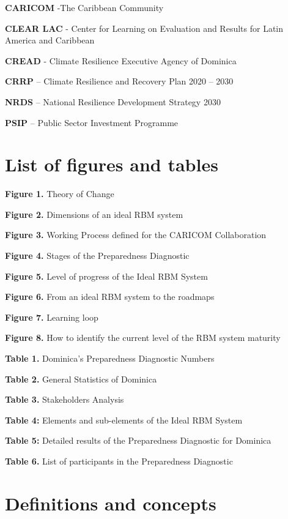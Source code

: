 \documentclass[
  10pt,
]{book}
\begin{document}
\textbf{CARICOM} -The Caribbean Community

\textbf{CLEAR LAC} - Center for Learning on Evaluation and Results for Latin America and Caribbean

\textbf{CREAD} - Climate Resilience Executive Agency of Dominica

\textbf{CRRP} -- Climate Resilience and Recovery Plan 2020 -- 2030

\textbf{NRDS} -- National Resilience Development Strategy 2030

\textbf{PSIP} -- Public Sector Investment Programme

\hypertarget{list-of-figures-and-tables}{%
\chapter*{List of figures and tables}\label{list-of-figures-and-tables}}

\textbf{Figure 1.} Theory of Change

\textbf{Figure 2.} Dimensions of an ideal RBM system

\textbf{Figure 3.} Working Process defined for the CARICOM Collaboration

\textbf{Figure 4.} Stages of the Preparedness Diagnostic

\textbf{Figure 5.} Level of progress of the Ideal RBM System

\textbf{Figure 6.} From an ideal RBM system to the roadmaps

\textbf{Figure 7.} Learning loop

\textbf{Figure 8.} How to identify the current level of the RBM system maturity

\textbf{Table 1.} Dominica's Preparedness Diagnostic Numbers

\textbf{Table 2.} General Statistics of Dominica

\textbf{Table 3.} Stakeholders Analysis

\textbf{Table 4:} Elements and sub-elements of the Ideal RBM System

\textbf{Table 5:} Detailed results of the Preparedness Diagnostic for Dominica

\textbf{Table 6.} List of participants in the Preparedness Diagnostic

\hypertarget{definitions-and-concepts}{%
\chapter*{Definitions and concepts}\label{definitions-and-concepts}}
\end{document}
